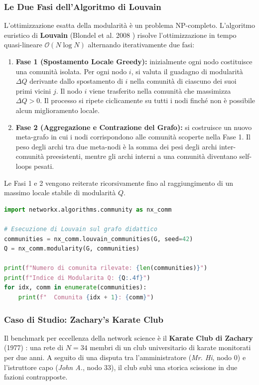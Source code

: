 \subsubsection{Le Due Fasi dell'Algoritmo di Louvain}
L'ottimizzazione esatta della modularità è un problema NP-completo. L'algoritmo euristico di \textbf{Louvain} (Blondel et al. 2008 \cite{blondel2008}) risolve l'ottimizzazione in tempo quasi-lineare $\mathcal{O}(N \log N)$ alternando iterativamente due fasi:
\begin{enumerate}
    \item \textbf{Fase 1 (Spostamento Locale Greedy):} inizialmente ogni nodo costituisce una comunità isolata. Per ogni nodo $i$, si valuta il guadagno di modularità $\Delta Q$ derivante dallo spostamento di $i$ nella comunità di ciascuno dei suoi primi vicini $j$. Il nodo $i$ viene trasferito nella comunità che massimizza $\Delta Q > 0$. Il processo si ripete ciclicamente su tutti i nodi finché non è possibile alcun miglioramento locale.
    \item \textbf{Fase 2 (Aggregazione e Contrazione del Grafo):} si costruisce un nuovo meta-grafo in cui i nodi corrispondono alle comunità scoperte nella Fase 1. Il peso degli archi tra due meta-nodi è la somma dei pesi degli archi inter-comunità preesistenti, mentre gli archi interni a una comunità diventano self-loops pesati.
\end{enumerate}
Le Fasi 1 e 2 vengono reiterate ricorsivamente fino al raggiungimento di un massimo locale stabile di modularità $Q$.

\begin{lstlisting}[language=Python, caption={Community detection con Louvain e calcolo della modularità in NetworkX.}]
import networkx.algorithms.community as nx_comm

# Esecuzione di Louvain sul grafo didattico
communities = nx_comm.louvain_communities(G, seed=42)
Q = nx_comm.modularity(G, communities)

print(f"Numero di comunita rilevate: {len(communities)}")
print(f"Indice di Modularita Q: {Q:.4f}")
for idx, comm in enumerate(communities):
    print(f"  Comunita {idx + 1}: {comm}")
\end{lstlisting}

\subsubsection{Caso di Studio: Zachary's Karate Club}
Il benchmark per eccellenza della network science è il \textbf{Karate Club di Zachary} (1977) \cite{zachary1977}: una rete di $N=34$ membri di un club universitario di karate monitorati per due anni. A seguito di una disputa tra l'amministratore (\textit{Mr. Hi}, nodo 0) e l'istruttore capo (\textit{John A.}, nodo 33), il club subì una storica scissione in due fazioni contrapposte.

